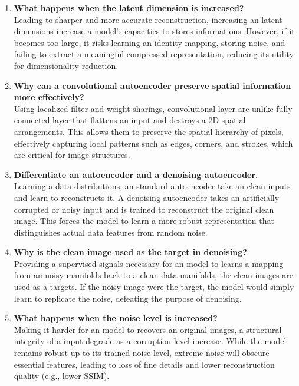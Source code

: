 \documentclass[10pt]{article}
\begin{document}
\begin{enumerate}
\item \textbf{What happens when the latent dimension is increased?}\\
Leading to sharper and more accurate reconstruction, increasing an latent dimensions increase a model's capacities to stores informations. However, if it becomes too large, it risks learning an identity mapping, storing noise, and failing to extract a meaningful compressed representation, reducing its utility for dimensionality reduction.

\item \textbf{Why can a convolutional autoencoder preserve spatial information more effectively?}\\
Using localized filter and weight sharings, convolutional layer are unlike fully connected layer that flattens an input and destroys a 2D spatial arrangements. This allows them to preserve the spatial hierarchy of pixels, effectively capturing local patterns such as edges, corners, and strokes, which are critical for image structures.

\item \textbf{Differentiate an autoencoder and a denoising autoencoder.}\\
Learning a data distributions, an standard autoencoder take an clean inputs and learn to reconstructs it. A denoising autoencoder takes an artificially corrupted or noisy input and is trained to reconstruct the original clean image. This forces the model to learn a more robust representation that distinguishes actual data features from random noise.

\item \textbf{Why is the clean image used as the target in denoising?}\\
Providing a supervised signals necessary for an model to learns a mapping from an noisy manifolds back to a clean data manifolds, the clean images are used as a targets. If the noisy image were the target, the model would simply learn to replicate the noise, defeating the purpose of denoising.

\item \textbf{What happens when the noise level is increased?}\\
Making it harder for an model to recovers an original images, a structural integrity of a input degrade as a corruption level increase. While the model remains robust up to its trained noise level, extreme noise will obscure essential features, leading to loss of fine details and lower reconstruction quality (e.g., lower SSIM).


\end{enumerate}
\end{document}
